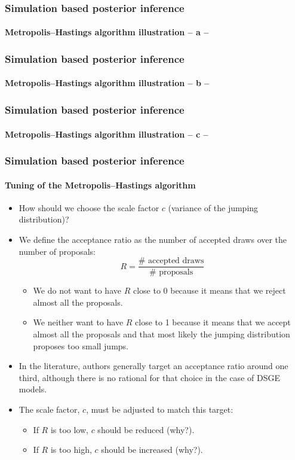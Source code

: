 \documentclass[10pt,slidestop]{beamer}
\begin{document}
\begin{frame}
  \frametitle{Simulation based posterior inference}
  \framesubtitle{Metropolis--Hastings algorithm illustration -- a --}

  \begin{center}
  \scalebox{.7}{}
  \end{center}
\end{frame}

\begin{frame}
  \frametitle{Simulation based posterior inference}
  \framesubtitle{Metropolis--Hastings algorithm illustration -- b --}

  \begin{center}
  \scalebox{.7}{}
  \end{center}
\end{frame}


\begin{frame}
  \frametitle{Simulation based posterior inference}
  \framesubtitle{Metropolis--Hastings algorithm illustration -- c --}

  \begin{center}
  \scalebox{.7}{}
  \end{center}
\end{frame}


\begin{frame}
  \frametitle{Simulation based posterior inference}
  \framesubtitle{Tuning of the Metropolis--Hastings algorithm}
  \begin{itemize}
  \item How should we choose the scale factor $c$ (variance of the jumping
    distribution)?
  \item We define the acceptance ratio as the number of accepted
    draws over the number of proposals:
    \[
    R = \frac{\# \text{ accepted draws}}{\# \text{ proposals}}
    \]
    {\footnotesize
      \begin{itemize}
      \item We do not want to have $R$ close to 0 because it means
        that we reject almost all the proposals.
      \item We neither want to have $R$ close to 1 because it means
        that we accept almost all the proposals and that most
        likely the jumping distribution proposes too small jumps.
      \end{itemize}}
  \item In the literature, authors generally target an acceptance
    ratio around one third, although there is no rational for
    that choice in the case of DSGE models.
  \item The scale factor, $c$, must be adjusted to match this
    target:
    {\footnotesize
      \begin{itemize}
      \item If $R$ is too low, $c$ should be reduced (why?).
      \item If $R$ is too high, $c$ should be increased (why?).
      \end{itemize}}
  \end{itemize}
\end{frame}
\end{document}

